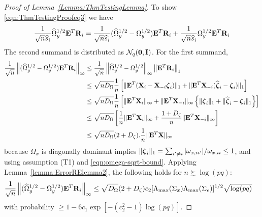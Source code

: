 \begin{proof}[Proof of Lemma~\ref{Lemma:ThmTestingLemma}]
To show \eqref{eqn:ThmTestingProofeq3} we have
%
\begin{align*}
\frac{1}{\sqrt n \widehat s_i}  \widehat \Omega_y^{1/2} {\mathbf{E}}^T {\mathbf{R}}_i =
\frac{1}{\sqrt n \widehat s_i}  (\widehat \Omega_y^{1/2} - \Omega_y^{1/2}) {\mathbf{E}}^T {\mathbf{R}}_i +
\frac{1}{\sqrt n \widehat s_i}  \Omega_y^{1/2} {\mathbf{E}}^T {\mathbf{R}}_i
\end{align*}
%
The second summand is distributed as ${\cal{N}}_q ({\bf 0}, {\mathbf{I}})$. For the first summand,
%
\begin{align*}
\frac{1}{\sqrt n}  \left\| (\widehat \Omega_y^{1/2} - \Omega_y^{1/2}) {\mathbf{E}}^T {\mathbf{R}}_i \right\|_\infty & \leq
\frac{1}{\sqrt n}  \left\| \widehat \Omega_y^{1/2} - \Omega_y^{1/2} \right\|_\infty  \left\| {\mathbf{E}}^T {\mathbf{R}}_i \right\|_1 \\
& \leq \sqrt{n D_\Omega} \frac{1}{n} \left[ \| {\mathbf{E}}^T ({\mathbf{X}}_i -  {\mathbf{X}}_{-i} {\boldsymbol{\zeta}}_i ) \|_1 + \| {\mathbf{E}}^T {\mathbf{X}}_{-i} (\widehat {{\boldsymbol{\zeta}}}_i - {\boldsymbol{\zeta}}_{i} ) \|_1 \right] \\
& \leq \sqrt{n D_\Omega} \frac{1}{n} \left[ \| {\mathbf{E}}^T {\mathbf{X}}_i \|_\infty + \| {\mathbf{E}}^T {\mathbf{X}}_{-i} \|_\infty
\left\{ \| {\boldsymbol{\zeta}}_i  \|_1 + \| \widehat {{\boldsymbol{\zeta}}}_i - {\boldsymbol{\zeta}}_i  \|_1 \right\} \right] \notag\\
& \leq \sqrt{n D_\Omega} \left[ \frac{1}{n} \| {\mathbf{E}}^T {\mathbf{X}}_i \|_\infty + 
\frac{1 + D_\zeta}{n} \| {\mathbf{E}}^T {\mathbf{X}}_{-i} \|_\infty \right] \\
& \leq \sqrt{n D_\Omega} (2 + D_\zeta) .\frac{1}{n} \| {\mathbf{E}}^T {\mathbf{X}} \|_\infty
\end{align*}
%
because $\Omega_x$ is diagonally dominant implies $\| {\boldsymbol{\zeta}}_i \|_1 = \sum_{i' \neq i} |\omega_{x,ii'}|/ \omega_{x,ii} \leq 1$, and using assumption (T1) and \eqref{eqn:omega-sqrt-bound}. Applying Lemma~\ref{lemma:ErrorRElemma2}, the following holds for $n \succsim \log (pq)$:
%
\begin{align}\label{eqn:ThmTestingProofeq31}
\frac{1}{\sqrt n}  \left\| (\widehat \Omega_y^{1/2} - \Omega_y^{1/2}) {\mathbf{E}}^T {\mathbf{R}}_i \right\|_\infty & \leq \sqrt{ D_\Omega} (2 + D_\zeta) c_2 [ \Lambda_{\max} (\Sigma_x) \Lambda_{\max} (\Sigma_e) ]^{1/2} \sqrt{ \log(pq)}
\end{align}
%
with probability $ \geq 1 - 6c_1 \exp [-(c_2^2-1) \log(pq)]$.


\end{proof}
